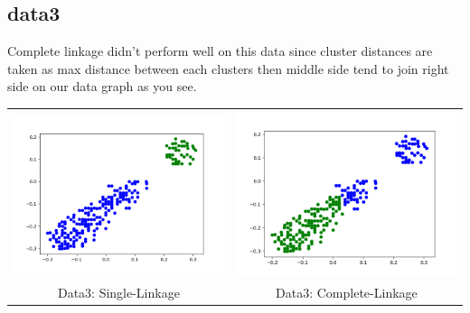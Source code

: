 \documentclass{article}
\begin{document}
\subsection{data3}
Complete linkage didn't perform well on this data since cluster distances are taken as max distance between each clusters then middle side tend to join right side on our data graph as you see.\\
\begin{tabular}{c|c}

\includegraphics[scale=0.4]{hac_images/data3single.png}&\includegraphics[scale=0.4]{hac_images/data3complete.png}\\
{Data3: Single-Linkage}&{Data3: Complete-Linkage}\\

\end{tabular}
\end{document}
